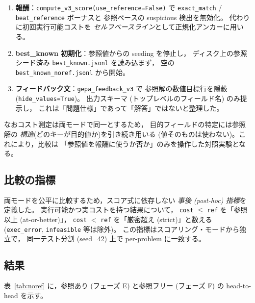 \documentclass[uplatex,dvipdfmx,a4paper,11pt]{jsarticle}
\begin{document}
\begin{enumerate}
  \item \textbf{報酬}：\texttt{compute\_v3\_score(use\_reference=False)} で
    \texttt{exact\_match} / \texttt{beat\_reference} ボーナスと
    参照ベースの suspicious 検出を無効化。
    代わりに初回実行可能コストを
    \emph{セルフベースライン}として正規化アンカーに用いる。
  \item \textbf{best\_known 初期化}：参照値からの seeding を停止し，
    ディスク上の参照シード済み \texttt{best\_known.jsonl} を読み込まず，
    空の \texttt{best\_known\_noref.jsonl} から開始。
  \item \textbf{フィードバック文}：\texttt{gepa\_feedback\_v3} で
    参照解の数値目標行を隠蔽 (\texttt{hide\_values=True})。
    出力スキーマ (トップレベルのフィールド名) のみ提示し，
    これは「問題仕様」であって「解答」ではないと整理した。
\end{enumerate}

なおコスト測定は両モードで同一とするため，
目的フィールドの特定には参照解の
\emph{構造}(どのキーが目的値か)を引き続き用いる
(値そのものは使わない)。これにより，比較は
「参照値を報酬に使うか否か」のみを操作した対照実験となる。

\subsection{比較の指標}

両モードを公平に比較するため，スコア式に依存しない
\emph{事後 (post-hoc) 指標}を定義した。
実行可能かつ実コストを持つ結果について，
\texttt{cost} $\le$ \texttt{ref} を「参照以上 (at-or-better)」，
\texttt{cost} $<$ \texttt{ref} を「厳密超え (strict)」と数える
(\texttt{exec\_error}, \texttt{infeasible} 等は除外)。
この指標はスコアリング・モードから独立で，
同一テスト分割 (seed=42) 上で per-problem に一致する。

\subsection{結果}

表~\ref{tab:noref} に，参照あり
(フェーズ E) と参照フリー (フェーズ F) の
head-to-head を示す。
\end{document}
